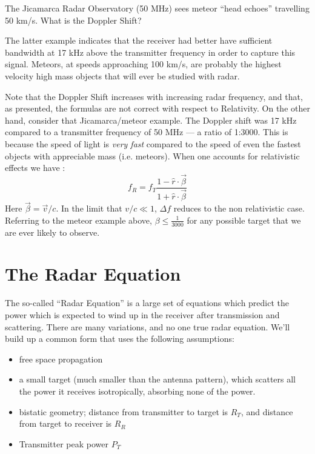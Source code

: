 \begin{example} The Jicamarca Radar Observatory (50 MHz) sees meteor
  ``head echoes'' travelling 50 km/s.  What is the Doppler Shift?

\end{example}

The latter example indicates that the receiver had better have sufficient bandwidth at 17 kHz above the transmitter frequency in order to capture this signal.  Meteors, at speeds approaching 100 km/s, are probably the highest velocity high mass objects that will ever be studied with radar.

Note that the Doppler Shift increases with increasing radar frequency, 
and that, as presented, the formulas are not correct with respect to
Relativity.  On the other hand, consider that Jicamarca/meteor
example.  The Doppler shift was 17 kHz compared to a transmitter
frequency of 50 MHz --- a ratio of 1:3000.  This is because the speed 
of light is \textit{very fast} compared to the speed of even the
fastest objects with appreciable mass (i.e. meteors).
When one accounts for relativistic effects we have  \cite{peebles-1998,levanon+mozesan-2004}:
\begin{equation}
f_R = f_T \frac{1 - \hat{r}\cdot \vec{\beta}}{1 + \hat{r}\cdot \vec{\beta}}
\end{equation}
Here $\vec{\beta} = \vec{v}/c$.  In the limit that $v/c \ll 1$, $\Delta f$ reduces to the non relativistic case.  Referring to the meteor example above, $\beta \le \frac{1}{3000}$ for any possible target that we are ever likely to observe.

\section{The Radar Equation}

The so-called ``Radar Equation'' is a large set
of equations which 
predict the power which is expected to wind up in the receiver after
transmission and scattering.  There are many variations, and no one
true radar equation.  We'll build up a common form that uses the
following assumptions:
\begin{itemize}
\item free space propagation
\item a small target (much smaller than the antenna pattern), which
  scatters all the power it receives isotropically, absorbing none of
  the power.
\item bistatic geometry; distance from transmitter to target is $R_T$,
  and distance from target to receiver is $R_R$
\item Transmitter peak power $P_T$
\end{itemize}

